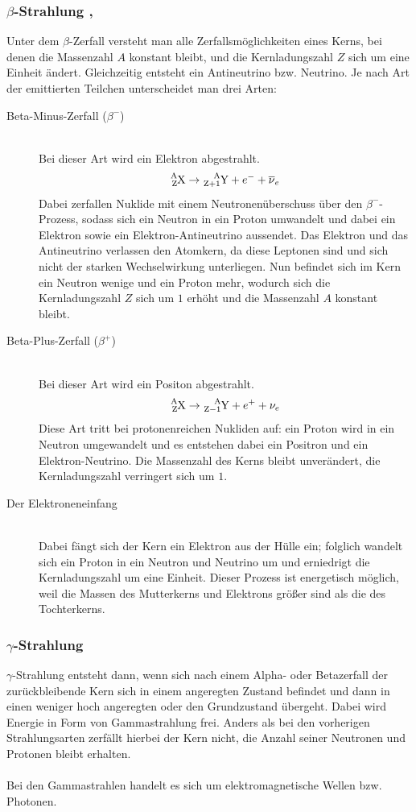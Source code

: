 \documentclass[a4paper,titlepage]{scrartcl}
\numberwithin{equation}{section}
\begin{document}
\subsubsection{$\beta$-Strahlung \cite{blauesBuch}, \cite{wiki:beta}}
Unter dem $\beta$-Zerfall versteht man alle Zerfallsmöglichkeiten eines Kerns, bei denen die Massenzahl $A$ konstant bleibt, und die Kernladungszahl $Z$ sich um eine Einheit ändert. Gleichzeitig entsteht ein Antineutrino bzw. Neutrino. Je nach Art der emittierten Teilchen unterscheidet man drei Arten:
\begin{description}
	\item[Beta-Minus-Zerfall ($\beta^{-}$)] \hfill \\Bei dieser Art wird ein Elektron abgestrahlt.
\begin{equation*}
\ce{^{A}_{Z}X} \rightarrow \ce{^{A}_{Z+1}Y} + e^{-}+ \overline{\nu}_e
\end{equation*}
Dabei zerfallen Nuklide mit einem Neutronenüberschuss über den $\beta^{-}$-Prozess, sodass sich ein Neutron in ein Proton umwandelt und dabei ein Elektron sowie ein Elektron-Antineutrino aussendet. Das Elektron und das Antineutrino verlassen den Atomkern, da diese Leptonen sind und sich nicht der starken Wechselwirkung unterliegen. Nun befindet sich im Kern ein Neutron wenige und ein Proton mehr, wodurch sich die Kernladungszahl $Z$ sich um $1$ erhöht und die Massenzahl $A$ konstant bleibt. 
    \item[Beta-Plus-Zerfall ($\beta^{+}$)] \hfill \\ Bei dieser Art wird ein Positon abgestrahlt.
\begin{equation*}
\ce{^{A}_{Z}X} \rightarrow \ce{^{A}_{Z-1}Y} + e^{+}+ \nu_e
\end{equation*}
Diese Art tritt bei protonenreichen Nukliden auf: ein Proton wird in ein Neutron umgewandelt und es entstehen dabei ein Positron und ein Elektron-Neutrino. Die Massenzahl des Kerns bleibt unverändert, die Kernladungszahl verringert sich um $1$.
	\item[Der Elektroneneinfang] \hfill \\Dabei fängt sich der Kern ein Elektron aus der Hülle ein; folglich wandelt sich ein Proton in ein Neutron und Neutrino um und erniedrigt die Kernladungszahl um eine Einheit. Dieser Prozess ist energetisch möglich, weil die Massen des Mutterkerns und Elektrons größer sind als die des Tochterkerns.
\end{description}
\subsubsection{$\gamma$-Strahlung \cite{wiki:gamma}}
$\gamma$-Strahlung entsteht dann, wenn sich nach einem Alpha- oder Betazerfall der zurückbleibende Kern sich in einem angeregten Zustand befindet und dann in einen weniger hoch angeregten oder den Grundzustand übergeht. Dabei wird Energie in Form von Gammastrahlung frei. Anders als bei den vorherigen Strahlungsarten zerfällt hierbei der Kern nicht, die Anzahl seiner Neutronen und Protonen bleibt erhalten.\\ \\
Bei den Gammastrahlen handelt es sich um elektromagnetische Wellen bzw. Photonen.
\end{document}

